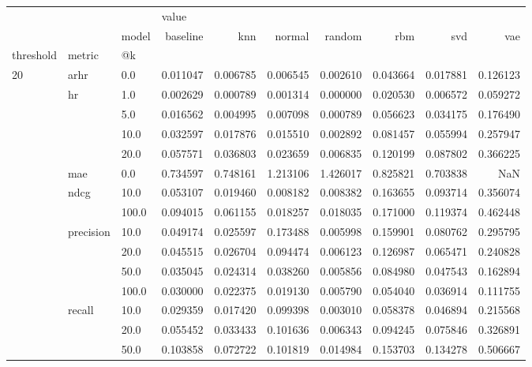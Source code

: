 \begin{tabular}{lllrrrrrrr}
\toprule
    &      & {} & \multicolumn{7}{l}{value} \\
    &      & model &  baseline &       knn &    normal &    random &       rbm &       svd &       vae \\
threshold & metric & @k &           &           &           &           &           &           &           \\
\midrule
20  & arhr & 0.0   &  0.011047 &  0.006785 &  0.006545 &  0.002610 &  0.043664 &  0.017881 &  0.126123 \\
    & hr & 1.0   &  0.002629 &  0.000789 &  0.001314 &  0.000000 &  0.020530 &  0.006572 &  0.059272 \\
    &      & 5.0   &  0.016562 &  0.004995 &  0.007098 &  0.000789 &  0.056623 &  0.034175 &  0.176490 \\
    &      & 10.0  &  0.032597 &  0.017876 &  0.015510 &  0.002892 &  0.081457 &  0.055994 &  0.257947 \\
    &      & 20.0  &  0.057571 &  0.036803 &  0.023659 &  0.006835 &  0.120199 &  0.087802 &  0.366225 \\
    & mae & 0.0   &  0.734597 &  0.748161 &  1.213106 &  1.426017 &  0.825821 &  0.703838 &       NaN \\
    & ndcg & 10.0  &  0.053107 &  0.019460 &  0.008182 &  0.008382 &  0.163655 &  0.093714 &  0.356074 \\
    &      & 100.0 &  0.094015 &  0.061155 &  0.018257 &  0.018035 &  0.171000 &  0.119374 &  0.462448 \\
    & precision & 10.0  &  0.049174 &  0.025597 &  0.173488 &  0.005998 &  0.159901 &  0.080762 &  0.295795 \\
    &      & 20.0  &  0.045515 &  0.026704 &  0.094474 &  0.006123 &  0.126987 &  0.065471 &  0.240828 \\
    &      & 50.0  &  0.035045 &  0.024314 &  0.038260 &  0.005856 &  0.084980 &  0.047543 &  0.162894 \\
    &      & 100.0 &  0.030000 &  0.022375 &  0.019130 &  0.005790 &  0.054040 &  0.036914 &  0.111755 \\
    & recall & 10.0  &  0.029359 &  0.017420 &  0.099398 &  0.003010 &  0.058378 &  0.046894 &  0.215568 \\
    &      & 20.0  &  0.055452 &  0.033433 &  0.101636 &  0.006343 &  0.094245 &  0.075846 &  0.326891 \\
    &      & 50.0  &  0.103858 &  0.072722 &  0.101819 &  0.014984 &  0.153703 &  0.134278 &  0.506667 \\

\end{tabular}
